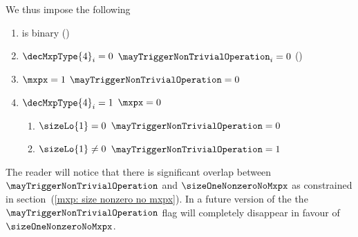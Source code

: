 We thus impose the following
\begin{enumerate}
    \item \mayTriggerNonTrivialOperation{} is binary \quad (\trash)
    \item \If $\decMxpType {4} _{i} = 0$ \Then $\mayTriggerNonTrivialOperation_{i} = 0$ \quad (\trash)
    \item \If $\mxpx = 1$                \Then $\mayTriggerNonTrivialOperation = 0$
    \item \If $\decMxpType {4} _{i} = 1$ \et $\mxpx = 0$ \Then
          \begin{enumerate}
              \item  \If $\sizeLo{1} =    0$ \Then $\mayTriggerNonTrivialOperation = 0$
              \item  \If $\sizeLo{1} \neq 0$ \Then $\mayTriggerNonTrivialOperation = 1$
          \end{enumerate}
\end{enumerate}
\saNote{}
The reader will notice that there is significant overlap between $\mayTriggerNonTrivialOperation$ and $\sizeOneNonzeroNoMxpx$ as constrained in
section~(\ref{mxp: size nonzero no mxpx}).
In a future version of the \mxpMod{} the $\mayTriggerNonTrivialOperation$ flag will completely disappear in favour of $\sizeOneNonzeroNoMxpx$.
